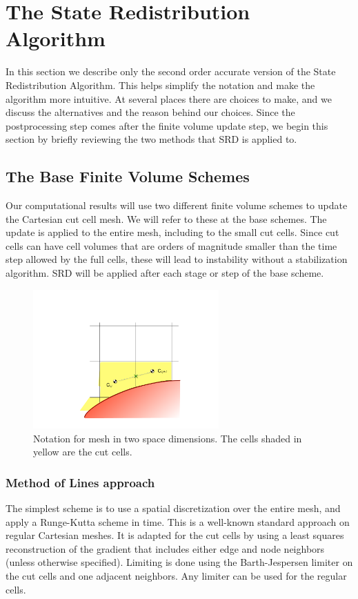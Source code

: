 \section{The State Redistribution Algorithm}\label{sec:srdAlg}

In this section we describe only the second order accurate version of the State
Redistribution Algorithm. 
This helps simplify the notation and make the
algorithm more intuitive.   
At several places there are choices
to make, and we discuss the alternatives and the reason behind our
choices.  Since the postprocessing step comes after the finite
volume update step, we begin this section by briefly reviewing the 
two methods that SRD is applied to.  

\subsection{The Base  Finite Volume Schemes}

Our computational results will use two different finite volume schemes
to update the Cartesian cut cell mesh.
We will refer to these at the base schemes. 
The  update is applied to the entire mesh, including  
to the small cut cells.  Since cut cells can have cell volumes that are
orders of magnitude smaller than the time step allowed by the full
cells, these will lead to instability without a stabilization algorithm.
SRD will be applied after each stage or step of the base scheme.

\begin{figure}
\begin{center}
\includegraphics[width=2.8in]{figs/2dfig.pdf}
\caption{\sf Notation for mesh in two space dimensions. The cells shaded
in yellow are the cut cells.} 
\label{fig:2dfig}
\end{center}
\end{figure}

\subsubsection{Method of Lines approach}
The simplest scheme is to use a spatial discretization over the entire
mesh, and apply a Runge-Kutta scheme in time. This is a well-known
standard approach
on regular Cartesian meshes. It is adapted for the cut cells by
using a least squares reconstruction of the gradient that includes
either edge and node neighbors (unless otherwise specified).
Limiting is done using the Barth-Jespersen limiter \cite{} 
on the cut cells and one adjacent neighbors. Any limiter
can be used for the regular cells.

